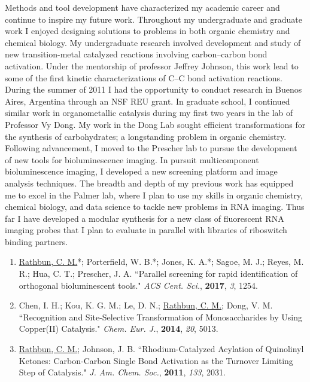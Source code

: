 \documentclass{nihbiosketch}
\begin{document}
\begin{statement}
Methods and tool development have characterized my academic career and continue
to inspire my future work. Throughout my undergraduate and graduate work I
enjoyed designing solutions to problems in both organic chemistry and chemical
biology. My undergraduate research involved development and study of new
transition-metal catalyzed reactions involving carbon--carbon bond activation.
Under the mentorship of professor Jeffrey Johnson, this work lead to some of the
first kinetic characterizations of C--C bond activation reactions. During the
summer of 2011 I had the opportunity to conduct research in Buenos Aires,
Argentina through an NSF REU grant. In graduate school, I continued similar work
in organometallic catalysis during my first two years in the lab of Professor Vy
Dong. My work in the Dong Lab sought efficient transformations for the synthesis
of carbohydrates; a longstanding problem in organic chemistry. Following
advancement, I moved to the Prescher lab
to pursue the development of new tools for bioluminescence imaging. In pursuit
multicomponent bioluminescence imaging, I developed a new screening platform
and image analysis techniques. The breadth and depth of my previous work has
equipped me to excel in the Palmer lab, where I plan to use my skills in
organic chemistry, chemical biology, and data science to tackle new problems in
RNA imaging. Thus far I have developed a modular synthesis for a new class of
fluorescent RNA imaging probes that I plan to evaluate in parallel with
libraries of riboswitch binding partners.


\begin{enumerate}

  \item \underline{Rathbun, C. M.}*; Porterfield, W. B.*; Jones, K. A.*; Sagoe, M. J.; Reyes, M. R.; Hua, C. T.; Prescher, J. A. ``Parallel screening for rapid identification of orthogonal bioluminescent tools." \textit{ACS Cent. Sci.}, \textbf{2017}, \textit{3}, 1254.

  \item Chen, I. H.; Kou, K. G. M.; Le, D. N.; \underline{Rathbun, C. M.}; Dong, V. M. ``Recognition and Site-Selective Transformation of Monosaccharides by Using Copper(II) Catalysis." \textit{Chem. Eur. J.}, \textbf{2014}, \textit{20}, 5013.

  \item \underline{Rathbun, C. M.}; Johnson, J. B. ``Rhodium-Catalyzed Acylation of Quinolinyl Ketones: Carbon-Carbon Single Bond Activation as the Turnover Limiting Step of Catalysis." \textit{J. Am. Chem. Soc.}, \textbf{2011}, \textit{133}, 2031.

\end{enumerate}

\end{statement}
\end{document}
